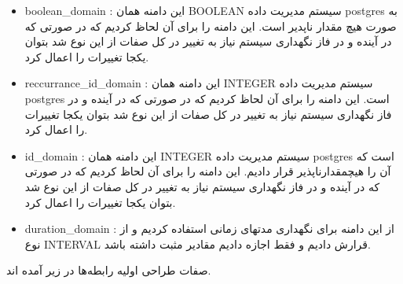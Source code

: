 \documentclass{article}
\begin{document}
\begin{itemize}
	\item
	boolean\_domain
	: این دامنه همان BOOLEAN سیستم مدیریت داده postgres به صورت هیچ مقدار ناپدیر است. این دامنه را برای آن لحاظ کردیم که در صورتی که در آینده و در فاز نگهداری سیستم نیاز به تغییر در کل صفات از این نوع شد بتوان یکجا تغییرات را اعمال کرد. 
	\item
	reccurrance\_id\_domain
	: این دامنه همان INTEGER سیستم مدیریت داده postgres است. این دامنه را برای آن لحاظ کردیم که در صورتی که در آینده و در فاز نگهداری سیستم نیاز به تغییر در کل صفات از این نوع شد بتوان یکجا تغییرات را اعمال کرد. 
	\item
	id\_domain
	: این دامنه همان INTEGER سیستم مدیریت داده postgres است که آن را هیچمقدارناپذیر قرار دادیم. این دامنه را برای آن لحاظ کردیم که در صورتی که در آینده و در فاز نگهداری سیستم نیاز به تغییر در کل صفات از این نوع شد بتوان یکجا تغییرات را اعمال کرد. 
	\item
	duration\_domain
	: از این دامنه برای نگهداری مدتهای زمانی استفاده کردیم و از نوع INTERVAL قرارش دادیم و فقط اجازه دادیم مقادیر مثبت داشته باشد. 
\end{itemize}
صفات طراحی اولیه رابطه‌ها در زیر آمده اند.
\latin
\end{document}
